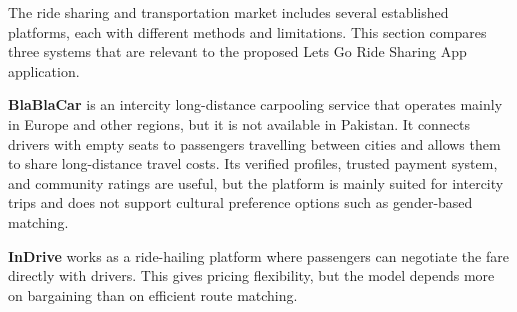 The ride sharing and transportation market includes several established platforms, each with different methods and limitations. This section compares three systems that are relevant to the proposed Lets Go Ride Sharing App application.

\textbf{BlaBlaCar} is an intercity long-distance carpooling service that operates mainly in Europe and other regions, but it is not available in Pakistan. It connects drivers with empty seats to passengers travelling between cities and allows them to share long-distance travel costs. Its verified profiles, trusted payment system, and community ratings are useful, but the platform is mainly suited for intercity trips and does not support cultural preference options such as gender-based matching.

\textbf{InDrive} works as a ride-hailing platform where passengers can negotiate the fare directly with drivers. This gives pricing flexibility, but the model depends more on bargaining than on efficient route matching.

